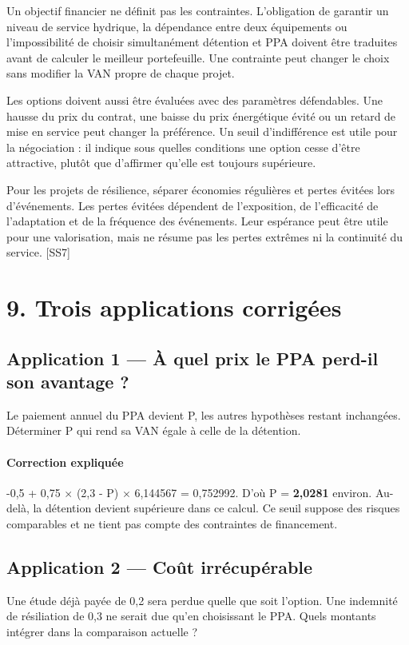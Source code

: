 \documentclass[12pt,a4paper]{article}
\begin{document}
Un objectif financier ne définit pas les contraintes. L’obligation de garantir un niveau de service hydrique, la dépendance entre deux équipements ou l’impossibilité de choisir simultanément détention et PPA doivent être traduites avant de calculer le meilleur portefeuille. Une contrainte peut changer le choix sans modifier la VAN propre de chaque projet.


Les options doivent aussi être évaluées avec des paramètres défendables. Une hausse du prix du contrat, une baisse du prix énergétique évité ou un retard de mise en service peut changer la préférence. Un seuil d’indifférence est utile pour la négociation : il indique sous quelles conditions une option cesse d’être attractive, plutôt que d’affirmer qu’elle est toujours supérieure.


Pour les projets de résilience, séparer économies régulières et pertes évitées lors d’événements. Les pertes évitées dépendent de l’exposition, de l’efficacité de l’adaptation et de la fréquence des événements. Leur espérance peut être utile pour une valorisation, mais ne résume pas les pertes extrêmes ni la continuité du service. [SS7]

\section*{9. Trois applications corrigées}

\subsection*{Application 1 --- À quel prix le PPA perd-il son avantage ?}
Le paiement annuel du PPA devient P, les autres hypothèses restant inchangées. Déterminer P qui rend sa VAN égale à celle de la détention.


\paragraph{Correction expliquée}
-0,5 + 0,75 $\times$ (2,3 - P) $\times$ 6,144567 = 0,752992. D’où P = \textbf{2,0281} environ. Au-delà, la détention devient supérieure dans ce calcul. Ce seuil suppose des risques comparables et ne tient pas compte des contraintes de financement.



\subsection*{Application 2 --- Coût irrécupérable}
Une étude déjà payée de 0,2 sera perdue quelle que soit l’option. Une indemnité de résiliation de 0,3 ne serait due qu’en choisissant le PPA. Quels montants intégrer dans la comparaison actuelle ?
\end{document}
